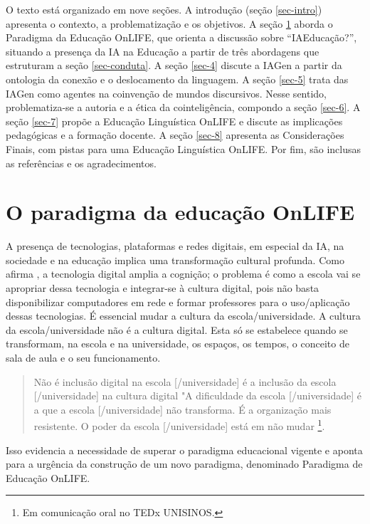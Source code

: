 \documentclass[portuguese]{textolivre}
\begin{document}
O texto está organizado em nove seções. A introdução (seção \ref{sec-intro}) apresenta o contexto, a problematização e os objetivos. A seção \ref{sec-normas} aborda o Paradigma da Educação OnLIFE, que orienta a discussão sobre “IAEducação?”, situando a presença da IA na Educação a partir de três abordagens que estruturam a seção \ref{sec-conduta}. A seção \ref{sec-4} discute a IAGen a partir da ontologia da conexão e o deslocamento da linguagem. A seção \ref{sec-5} trata das IAGen como agentes na coinvenção de mundos discursivos. Nesse sentido, problematiza-se a autoria e a ética da cointeligência, compondo a seção \ref{sec-6}. A seção \ref{sec-7} propõe a Educação Linguística OnLIFE e discute as implicações pedagógicas e a formação docente. A seção \ref{sec-8} apresenta as Considerações Finais, com pistas para uma Educação Linguística OnLIFE. Por fim, são inclusas as referências e os agradecimentos.

\section{O paradigma da educação OnLIFE}\label{sec-normas}
A presença de tecnologias, plataformas e redes digitais, em especial da IA, na sociedade e na educação implica uma transformação cultural profunda. Como afirma \textcite{Fagundes2011CulturaDigital}, a tecnologia digital amplia a cognição; o problema é como a escola vai se apropriar dessa tecnologia e integrar-se à cultura digital, pois não basta disponibilizar computadores em rede e formar professores para o uso/aplicação dessas tecnologias. É essencial mudar a cultura da escola/universidade. A cultura da escola/universidade não é a cultura digital. Esta só se estabelece quando se transformam, na escola e na universidade, os espaços, os tempos, o conceito de sala de aula e o seu funcionamento.

\begin{quote}
    Não é inclusão digital na escola [/universidade] é a inclusão da escola [/universidade] na cultura digital "A dificuldade da escola [/universidade] é a que a escola [/universidade] não transforma. É a organização mais resistente. O poder da escola [/universidade] está em não mudar \cite{Fagundes2011CulturaDigital}\footnote{Em comunicação oral no TEDx UNISINOS.}.
\end{quote}


Isso evidencia a necessidade de superar o paradigma educacional vigente e aponta para a urgência da construção de um novo paradigma, denominado Paradigma de Educação OnLIFE. 
\end{document}
